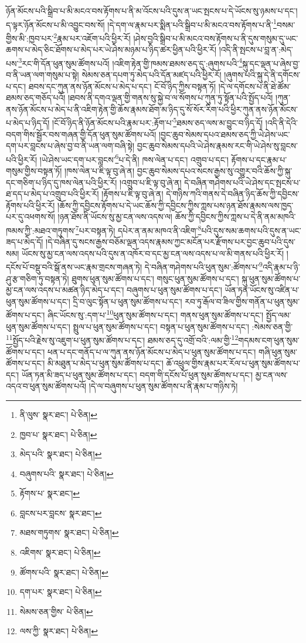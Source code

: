 ཉོན་མོངས་པའི་སྒྲིབ་པ་མི་མངའ་བས་རྟོགས་པ་ནི་མ་འོངས་པའི་དུས་ན་ཡང་སྤངས་པ་དེ་ཡོངས་སུ་ཉམས་པ་དང་། ད་ལྟར་ཉོན་མོངས་པ་མི་འབྱུང་བས་སོ། །དེ་དག་ལ་རྣམ་པར་སྨིན་པའི་སྒྲིབ་པ་མི་མངའ་བས་རྟོགས་པ་ནི་\footnote{ནི་ལུས་  སྣར་ཐང་།  པེ་ཅིན། }བསམ་གྱིས་མི་:ཁྱབ་པར་\footnote{ཁྱབ་པ་  སྣར་ཐང་།  པེ་ཅིན། }རྣམ་པར་འཇོག་པའི་ཕྱིར་རོ། །ཤེས་བྱའི་སྒྲིབ་པ་མི་མངའ་བས་རྟོགས་པ་ནི་དུས་གསུམ་དུ་ཡང་ཆགས་པ་མེད་ཅིང་ཐོགས་པ་མེད་པར་ཡེ་ཤེས་མཉམ་པ་ཉིད་ཚར་ཕྱིན་པའི་ཕྱིར་རོ། །འདི་ནི་སྤངས་པ་བླ་ན་:མེད་པས་\footnote{མེད་པའི་  སྣར་ཐང་།  པེ་ཅིན། }རང་གི་དོན་ཕུན་སུམ་ཚོགས་པའོ། །འཇིག་རྟེན་གྱི་ཁམས་ཐམས་ཅད་དུ་:ཞུགས་པའི་\footnote{བཞུགས་པའི་  སྣར་ཐང་།  པེ་ཅིན། }སྐུ་དང་ལྡན་པ་ཞེས་བྱ་བ་ནི་ཡན་ལག་གསུམ་པ་སྟེ། སེམས་ཅན་དཔག་ཏུ་མེད་པའི་དོན་མཛད་པའི་ཕྱིར་རོ། །ཞུགས་པའི་སྐུ་དེ་ནི་དགོངས་པ་དང་། ཐབས་དང་ཀུན་ནས་ཉོན་མོངས་པ་མེད་པ་དང་། ངོ་བོ་ཉིད་ཀྱིས་བསྟན་ཏོ། །དེ་ལ་དགོངས་པ་ནི་ཐེ་ཚོམ་ཐམས་ཅད་གཅོད་པའོ། །ཐབས་ནི་དགའ་ལྡན་གྱི་གནས་སུ་སྐྱེ་བ་ལ་སོགས་པ་ཀུན་ཏུ་སྟོན་པའི་སྤྱོད་པའོ། །ཀུན་ནས་ཉོན་མོངས་པ་མེད་པ་ནི་འཇིག་རྟེན་གྱི་ཆོས་རྣམས་ཐོག་མ་ཉིད་དུ་སོ་སོར་རིག་པའི་ཕྱིར་ཀུན་ནས་ཉོན་མོངས་པ་མེད་པ་ཉིད་དོ། །ངོ་བོ་ཉིད་ནི་ཉོན་མོངས་པའི་རྣམ་པར་:རྟོག་པ་\footnote{རྟོགས་པ་  སྣར་ཐང་། }ཐམས་ཅད་ལས་མ་བྱུང་བ་ཉིད་དོ། །འདི་ནི་དེའི་བདག་གིས་སྦྱོར་བས་གཞན་གྱི་དོན་ཕུན་སུམ་ཚོགས་པའོ། །བྱང་ཆུབ་སེམས་དཔའ་ཐམས་ཅད་ཀྱི་ཡེ་ཤེས་ཡང་དག་པར་བླངས་པ་ཞེས་བྱ་བ་ནི་ཡན་ལག་བཞི་སྟེ། བྱང་ཆུབ་སེམས་དཔའི་ཡེ་ཤེས་རྣམས་རང་གི་ཡེ་ཤེས་སུ་བླངས་པའི་ཕྱིར་རོ། །ཡེ་ཤེས་ཡང་དག་པར་བླངས་\footnote{བླངས་པར་བླངས་  སྣར་ཐང་། }པ་དེ་ནི། ཁས་ལེན་པ་དང་། འགྲུབ་པ་དང་། རྟོགས་པ་དང་རྣམ་པ་གསུམ་གྱིས་བསྟན་ཏོ། །ཁས་ལེན་པ་ཇི་ལྟ་བུ་ཞེ་ན། བྱང་ཆུབ་སེམས་དཔའ་སངས་རྒྱས་སུ་འགྱུར་བའི་ཆོས་ཀྱི་སྐུ་དང་གཅིག་པ་ཉིད་དུ་ཁས་ལེན་པའི་ཕྱིར་རོ། །འགྲུབ་པ་ཇི་ལྟ་བུ་ཞེ་ན། དེ་བཞིན་གཤེགས་པའི་ཡེ་ཤེས་དང་སྤངས་པ་ཐ་དད་པ་མེད་པ་འགྲུབ་པའི་ཕྱིར་རོ། །རྟོགས་པ་ཇི་ལྟ་བུ་ཞེ་ན། དེ་གཉིས་ཀའི་གནས་དེ་བཞིན་ཉིད་ཆོས་ཀྱི་དབྱིངས་རྟོགས་པའི་ཕྱིར་རོ། །ཆོས་ཀྱི་དབྱིངས་རྟོགས་པ་དེ་ཡང་ཆོས་ཀྱི་དབྱིངས་ཀྱིས་ཀླས་པས་ཉན་ཐོས་རྣམས་ལས་ཁྱད་པར་དུ་འཕགས་སོ། །ཉན་ཐོས་ནི་ཡོངས་སུ་མྱ་ངན་ལས་འདས་ལ། ཆོས་ཀྱི་དབྱིངས་ཀྱིས་ཀླས་པ་དེ་ནི་ནམ་མཁའི་ཁམས་ཀྱི་:མཐའ་གཏུགས་\footnote{མཐས་གཏུགས་  སྣར་ཐང་།  པེ་ཅིན། }པར་བསྟན་ཏེ། དཔེར་ན་ནམ་མཁའ་ནི་འཇིག་\footnote{འཇིགས་  སྣར་ཐང་།  པེ་ཅིན། }པའི་དུས་སམ་ཆགས་པའི་དུས་ན་ཡང་ཟད་པ་མེད་དོ། །དེ་བཞིན་དུ་སངས་རྒྱས་བཅོམ་ལྡན་འདས་རྣམས་ཀྱང་མངོན་པར་རྫོགས་པར་བྱང་ཆུབ་པའི་དུས་སམ། ཡོངས་སུ་མྱ་ངན་ལས་འདས་པའི་དུས་ན་འཁོར་བ་དང་མྱ་ངན་ལས་འདས་པ་ལ་མི་གནས་པའི་ཕྱིར་རོ། །དངོས་པོ་བསྡུ་བའི་སྒོ་ནས་ཡང་རྣམ་གྲངས་གཞན་ཏེ། དེ་བཞིན་གཤེགས་པའི་ཕུན་སུམ་:ཚོགས་པ་\footnote{ཚོགས་པའི་  སྣར་ཐང་།  པེ་ཅིན། }འདི་རྣམ་པ་ཉི་ཤུ་རྩ་གཅིག་ཏུ་བསྟན་ཏེ། ཐུགས་ཕུན་སུམ་ཚོགས་པ་དང་། གསུང་ཕུན་སུམ་ཚོགས་པ་དང་། སྐུ་ཕུན་སུམ་ཚོགས་པ་མྱ་ངན་ལས་འདས་པ་མཚན་ཉིད་མེད་པ་དང་། བཞུགས་པ་ཕུན་སུམ་ཚོགས་པ་དང་། ཡོན་ཏན་ཡོངས་སུ་འཛིན་པ་ཕུན་སུམ་ཚོགས་པ་དང་། དྲི་བ་ལུང་སྟོན་པ་ཕུན་སུམ་ཚོགས་པ་དང་། རབ་ཏུ་རྒོལ་བ་ཟིལ་གྱིས་གནོན་པ་ཕུན་སུམ་ཚོགས་པ་དང་། ཞིང་ཡོངས་སུ་:དག་པ་\footnote{དག་པར་  སྣར་ཐང་།  པེ་ཅིན། }ཕུན་སུམ་ཚོགས་པ་དང་། གནས་ཕུན་སུམ་ཚོགས་པ་དང་། སྤྱོད་ལམ་ཕུན་སུམ་ཚོགས་པ་དང་། སྤྲུལ་པ་ཕུན་སུམ་ཚོགས་པ་དང་། བསྟན་པ་ཕུན་སུམ་ཚོགས་པ་དང་། :སེམས་ཅན་གྱི་\footnote{སེམས་ཅན་གྱིས་  པེ་ཅིན། }སྤྱོད་པའི་རྗེས་སུ་འཇུག་པ་ཕུན་སུམ་ཚོགས་པ་དང་། ཐམས་ཅད་དུ་འགྲོ་བའི་:ལམ་གྱི་\footnote{ལས་ཀྱི་  སྣར་ཐང་།  པེ་ཅིན། }གདམས་ངག་ཕུན་སུམ་ཚོགས་པ་དང་། ཕན་པ་དང་གནོད་པ་ལ་ཀུན་ནས་ཉོན་མོངས་པ་མེད་པ་ཕུན་སུམ་ཚོགས་པ་དང་། གཞི་ཕུན་སུམ་ཚོགས་པ་དང་། མི་མཐུན་པ་མེད་པ་ཕུན་སུམ་ཚོགས་པ་དང་། ཆོ་འཕྲུལ་གྱིས་རྣམ་པར་རོལ་པ་ཕུན་སུམ་ཚོགས་པ་དང་། ཡོན་ཏན་མི་ཟད་པ་ཕུན་སུམ་ཚོགས་པ་དང་། བདག་གི་དངོས་པོ་ཕུན་སུམ་ཚོགས་པ་དང་། མྱ་ངན་ལས་འདའ་བ་ཕུན་སུམ་ཚོགས་པའོ། །དེ་ལ་བཞུགས་པ་ཕུན་སུམ་ཚོགས་པ་ནི་རྣམ་པ་གཉིས་ཏེ། 